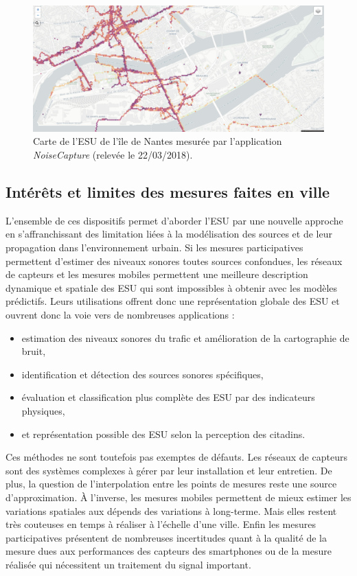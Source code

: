 \begin{figure}[t]
\centering
\includegraphics[width=0.7\linewidth]{./figures/cartographie/noise_modelling.PNG}
\caption{Carte de l'ESU de l'île de Nantes mesurée par l'application \textit{NoiseCapture}  (relevée le 22/03/2018).}
\label{fig:carte_noiseModelling}
\end{figure}

\subsection{Intérêts et limites des mesures faites en ville}

L'ensemble de ces dispositifs permet d'aborder l'ESU par une nouvelle approche en s'affranchissant des limitation liées à la modélisation des sources et de leur propagation dans l'environnement urbain. 
Si les mesures participatives permettent d'estimer des niveaux sonores toutes sources confondues, les réseaux de capteurs et les mesures mobiles permettent une meilleure description dynamique et spatiale des ESU qui sont impossibles à obtenir avec les modèles prédictifs. Leurs utilisations offrent donc une représentation globale des ESU et ouvrent donc la voie vers de nombreuses applications :

\begin{itemize}
\item estimation des niveaux sonores du trafic et amélioration de la cartographie de bruit,
\item identification et détection des sources sonores spécifiques, 
\item évaluation et classification plus complète des ESU par des indicateurs physiques,
\item et représentation possible des ESU selon la perception des citadins.
\end{itemize}

Ces méthodes ne sont toutefois pas exemptes de défauts.
Les réseaux de capteurs sont des systèmes complexes à gérer par leur installation et leur entretien. De plus, la question de l'interpolation entre les points de mesures reste une source d'approximation.
À l'inverse, les mesures mobiles permettent de mieux estimer les variations spatiales aux dépends des variations à long-terme. Mais elles restent très couteuses en temps à réaliser à l'échelle d'une ville. Enfin les mesures participatives présentent de nombreuses incertitudes quant à la qualité de la mesure dues aux performances des capteurs des smartphones ou de la mesure réalisée qui nécessitent un traitement du signal important.


